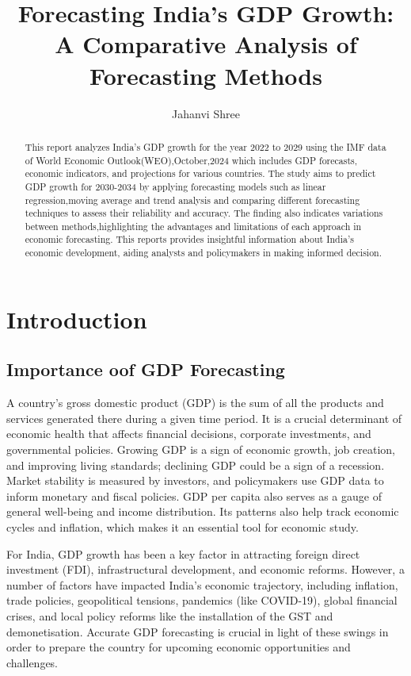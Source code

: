 \documentclass{article}
\title{Forecasting India's GDP Growth: A Comparative Analysis of Forecasting Methods}
\author{Jahanvi Shree}
\begin{document}
\maketitle

\begin{abstract}
This report analyzes India's GDP growth for the year 2022 to 2029 using the IMF data of World Economic Outlook(WEO),October,2024 which includes GDP forecasts, economic indicators, and projections for various countries. The study aims to predict GDP growth for 2030-2034 by applying forecasting models such as linear regression,moving average and trend analysis and comparing different forecasting techniques to assess their reliability and accuracy. The finding also indicates variations between methods,highlighting the advantages and limitations of each approach in economic forecasting. This reports provides insightful information about India's economic development, aiding analysts and policymakers in making informed decision.
\end{abstract}

\section{Introduction}




\subsection{Importance oof GDP Forecasting}
A country's gross domestic product (GDP) is the sum of all the products and services generated there during a given time period.  It is a crucial determinant of economic health that affects financial decisions, corporate investments, and governmental policies.  Growing GDP is a sign of economic growth, job creation, and improving living standards; declining GDP could be a sign of a recession.  Market stability is measured by investors, and policymakers use GDP data to inform monetary and fiscal policies.  GDP per capita also serves as a gauge of general well-being and income distribution.  Its patterns also help track economic cycles and inflation, which makes it an essential tool for economic study.


For India, GDP growth has been a key factor in attracting foreign direct investment (FDI), infrastructural development, and economic reforms.  However, a number of factors have impacted India's economic trajectory, including inflation, trade policies, geopolitical tensions, pandemics (like COVID-19), global financial crises, and local policy reforms like the installation of the GST and demonetisation.  Accurate GDP forecasting is crucial in light of these swings in order to prepare the country for upcoming economic opportunities and challenges.
\end{document}
